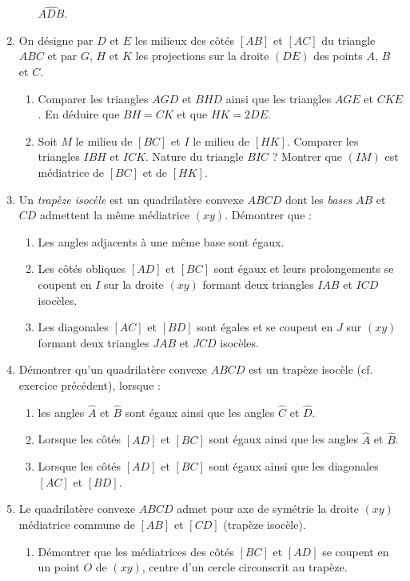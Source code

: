 \documentclass[12 pt]{report}
\theoremstyle{plain}
\newcounter{n}
\begin{document}
\begin{enumerate}
\begin{enumerate}
$\widehat{ADB}$. 
\end{enumerate}
\item On désigne par $D$ et $E$ les milieux des côtés $[AB]$ et $[AC]$ du triangle $ABC$ et par $G$, $H$ et $K$ les projections sur la droite $(DE)$ des points $A$, $B$ et $C$. \begin{enumerate}
\item Comparer les triangles $AGD$ et $BHD$ ainsi que les triangles $AGE$ et $CKE$. 
En déduire que $BH=CK$ et que $HK=2DE$. 
\item Soit $M$ le milieu de $[BC]$ et $I$ le milieu de $[HK]$. Comparer les triangles $IBH$ et $ICK$. Nature du triangle $BIC$ ? Montrer que $(IM)$ est médiatrice de $[BC]$ et de $[HK]$. 
\end{enumerate}
\item Un \emph{trapèze isocèle} est un quadrilatère convexe $ABCD$ dont les \emph{bases} $AB$ et $CD$ admettent la même médiatrice $(xy)$. Démontrer que : 
\begin{enumerate}
\item Les angles adjacents à une même base sont égaux. 
\item Les côtés obliques $[AD]$ et $[BC]$ sont égaux et leurs prolongements se coupent en $I$ sur la droite $(xy)$ formant deux triangles $IAB$ et $ICD$ isocèles. 
\item Les diagonales $[AC]$ et $[BD]$ sont égales et se coupent en $J$ sur $(xy)$
formant deux triangles $JAB$ et $JCD$ isocèles.
\end{enumerate}
\item Démontrer qu'un quadrilatère convexe $ABCD$ est un trapèze isocèle (cf. exercice précédent), lorsque : \begin{enumerate}
\item les angles $\widehat{A}$ et $\widehat{B}$ sont égaux ainsi que les angles 
$\widehat{C}$ et $\widehat{D}$. 
\item Lorsque les côtés $[AD]$ et $[BC]$ sont égaux ainsi que les angles $\widehat{A}$ et $\widehat{B}$.
\item Lorsque les côtés $[AD]$ et $[BC]$ sont égaux ainsi que les diagonales $[AC]$ et $[BD]$.
\end{enumerate}
\item Le quadrilatère convexe $ABCD$ admet pour axe de symétrie la droite $(xy)$ médiatrice commune de $[AB]$ et $[CD]$ (trapèze isocèle). \begin{enumerate}
\item Démontrer que les médiatrices des côtés $[BC]$ et $[AD]$ se coupent en un point $O$ de $(xy)$, centre d'un cercle circonscrit au trapèze. 

\end{enumerate}
\end{enumerate}
\end{document}
